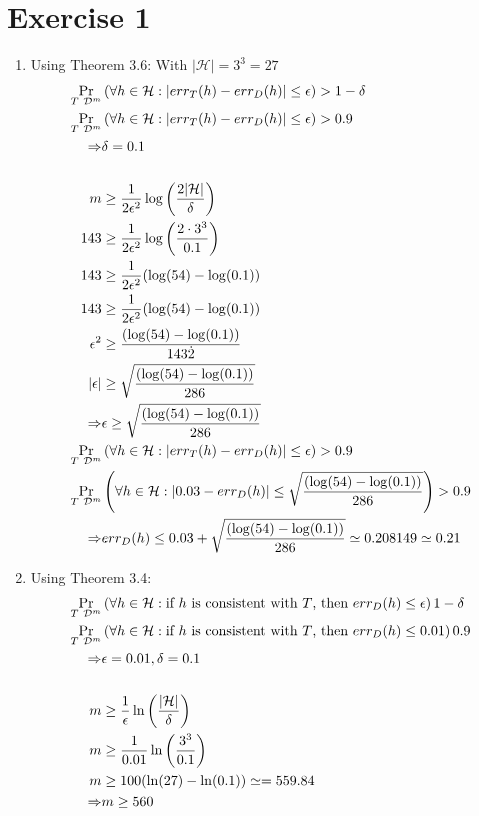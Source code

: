 \documentclass[12pt]{article}
\DeclarePairedDelimiter\abs{\lvert}{\rvert}
\begin{document}
\section*{Exercise 1}
\begin{enumerate}[label= (\alph*)]
	\item	Using Theorem 3.6: With \(|\mathcal{H}| = 3^3 = 27\)
			\begin{align*}
				\Pr_{T ~ \mathcal{D}^m} &\left( \forall h \in \mathcal{H}: \abs{err_T(h) - err_D(h)} \leq \epsilon \right) > 1 - \delta \\
				\Pr_{T ~ \mathcal{D}^m} &\left( \forall h \in \mathcal{H}: \abs{err_T(h) - err_D(h)} \leq \epsilon \right) > 0.9 \\
				\Rightarrow &\delta = 0.1 \\\\
				m &\geq \frac{1}{2\epsilon^2} \log \left( \frac{2\abs{\mathcal{H}}}{\delta} \right) \\
				143 &\geq \frac{1}{2\epsilon^2} \log \left( \frac{2 \cdot 3^3}{0.1} \right) \\
				143 &\geq \frac{1}{2\epsilon^2} (\log(54) - \log(0.1)) \\
				143 &\geq \frac{1}{2\epsilon^2} (\log(54) - \log(0.1)) \\
				\epsilon^2 &\geq \frac{(\log(54) - \log(0.1))}{143 \dot 2} \\
				\abs{\epsilon} &\geq \sqrt{\frac{(\log(54) - \log(0.1))}{286}} \\
				\Rightarrow &\epsilon \geq \sqrt{\frac{(\log(54) - \log(0.1))}{286}} \\
				\Pr_{T ~ \mathcal{D}^m} &\left( \forall h \in \mathcal{H}: \abs{err_T(h) - err_D(h)} \leq \epsilon \right) > 0.9 \\
				\Pr_{T ~ \mathcal{D}^m} &\left( \forall h \in \mathcal{H}: \abs{0.03 - err_D(h)} \leq \sqrt{\frac{(\log(54) - \log(0.1))}{286}} \right) > 0.9 \\
				\Rightarrow &err_D(h) \leq 0.03 + \sqrt{\frac{(\log(54) - \log(0.1))}{286}} \simeq 0.208149 \simeq 0.21
			\end{align*}
	\item	Using Theorem 3.4:
			\begin{align*}
				\Pr_{T ~ \mathcal{D}^m} &\left( \forall h \in \mathcal{H}: \text{if $h$ is consistent with $T$, then } err_D(h) \leq \epsilon \right) 1 - \delta \\
				\Pr_{T ~ \mathcal{D}^m} &\left( \forall h \in \mathcal{H}: \text{if $h$ is consistent with $T$, then } err_D(h) \leq 0.01 \right) 0.9 \\
				\Rightarrow &\epsilon = 0.01, \delta = 0.1 \\\\
				m &\geq \frac{1}{\epsilon} \ln \left( \frac{\abs{\mathcal{H}}}{\delta} \right) \\
				m &\geq \frac{1}{0.01} \ln \left( \frac{3^3}{0.1} \right) \\
				m &\geq 100 (\ln(27) - \ln(0.1)) \simeq = 559.84 \\
				\Rightarrow &m \geq 560
			\end{align*}
\end{enumerate}
\end{document}
